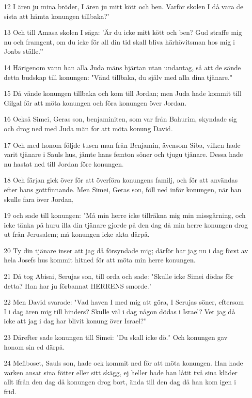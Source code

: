 \par 12 I ären ju mina bröder, I ären ju mitt kött och ben. Varför skolen I då vara de sista att hämta konungen tillbaka?'
\par 13 Och till Amasa skolen I säga: 'Är du icke mitt kött och ben? Gud straffe mig nu och framgent, om du icke för all din tid skall bliva härhövitsman hos mig i Joabs ställe.'"
\par 14 Härigenom vann han alla Juda mäns hjärtan utan undantag, så att de sände detta budskap till konungen: "Vänd tillbaka, du själv med alla dina tjänare."
\par 15 Då vände konungen tillbaka och kom till Jordan; men Juda hade kommit till Gilgal för att möta konungen och föra konungen över Jordan.
\par 16 Också Simei, Geras son, benjaminiten, som var från Bahurim, skyndade sig och drog ned med Juda män for att möta konung David.
\par 17 Och med honom följde tusen man från Benjamin, ävensom Siba, vilken hade varit tjänare i Sauls hus, jämte hans femton söner och tjugu tjänare. Dessa hade nu hastat ned till Jordan före konungen.
\par 18 Och färjan gick över för att överföra konungens familj, och för att användas efter hans gottfinnande. Men Simei, Geras son, föll ned inför konungen, när han skulle fara över Jordan,
\par 19 och sade till konungen: "Må min herre icke tillräkna mig min missgärning, och icke tänka på huru illa din tjänare gjorde på den dag då min herre konungen drog ut från Jerusalem; må konungen icke akta därpå.
\par 20 Ty din tjänare inser att jag då försyndade mig; därför har jag nu i dag först av hela Josefs hus kommit hitned för att möta min herre konungen.
\par 21 Då tog Abisai, Serujas son, till orda och sade: "Skulle icke Simei dödas för detta? Han har ju förbannat HERRENS smorde."
\par 22 Men David svarade: "Vad haven I med mig att göra, I Serujas söner, eftersom I i dag ären mig till hinders? Skulle väl i dag någon dödas i Israel? Vet jag då icke att jag i dag har blivit konung över Israel?"
\par 23 Därefter sade konungen till Simei: "Du skall icke dö." Och konungen gav honom sin ed därpå.
\par 24 Mefiboset, Sauls son, hade ock kommit ned för att möta konungen. Han hade varken ansat sina fötter eller sitt skägg, ej heller hade han låtit två sina kläder allt ifrån den dag då konungen drog bort, ända till den dag då han kom igen i frid.
